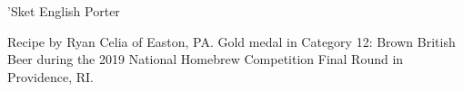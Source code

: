 \begin{recipe}{'Sket English Porter}

\begin{aboutblock}
Recipe by Ryan Celia of Easton, PA. Gold medal in Category 12: Brown British
Beer during the 2019 National Homebrew Competition Final Round in Providence, RI.
\sourceaha
\end{aboutblock}


\begin{methodandtiming}
 
\begin{mashsteps}
\end{mashsteps}

\begin{fermentationsteps}
\end{fermentationsteps}

\end{methodandtiming}

\recipebreak

\begin{ingredientsblock}

\begin{malts}
\end{malts}

\begin{hops}
\end{hops}


\end{ingredientsblock}

\end{recipe}
